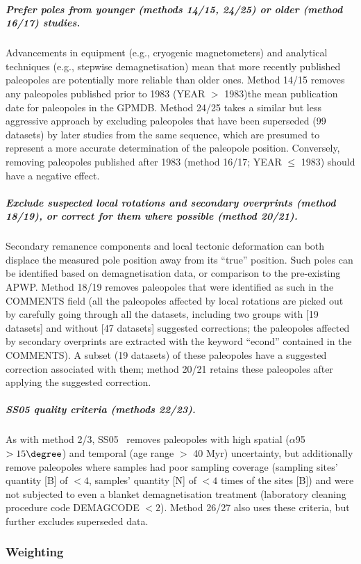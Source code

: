 \subparagraph{Prefer poles from younger (methods 14/15, 24/25) or older (method
16/17) studies.} Advancements in equipment (e.g., cryogenic magnetometers) and
analytical techniques (e.g., stepwise demagnetisation) mean that more recently
published paleopoles are potentially more reliable than older ones. Method 14/15
removes any paleopoles published prior to 1983 (YEAR $>$ 1983)\textemdash{}the
mean publication date for paleopoles in the GPMDB\@. Method 24/25 takes a
similar but less aggressive approach by excluding paleopoles that have been
superseded (99 datasets) by later studies from the same sequence, which are
presumed to represent a more accurate determination of the paleopole position.
Conversely, removing paleopoles published after 1983 (method 16/17; YEAR $\leq$
1983) should have a negative effect.

\subparagraph{Exclude suspected local rotations and secondary overprints
(method 18/19), or correct for them where possible (method 20/21).} Secondary
remanence components and local tectonic deformation can both displace the
measured pole position away from its ``true'' position. Such poles can be
identified based on demagnetisation data, or comparison to the pre-existing
APWP\@. Method 18/19 removes paleopoles that were identified as such in the
COMMENTS field (all the paleopoles affected by local rotations are picked out
by carefully going through all the datasets, including two groups with [19
datasets] and without [47 datasets] suggested corrections; the paleopoles
affected by secondary overprints are extracted with the keyword ``econd''
contained in the COMMENTS). A subset (19 datasets) of these paleopoles have a
suggested correction associated with them; method 20/21 retains these paleopoles
after applying the suggested correction.

\subparagraph{SS05 quality criteria (methods 22/23).} As with method 2/3,
SS05~\cite{S05} removes paleopoles with high spatial ($\alpha$95 $>15\degree$)
and temporal (age range $>$ 40 Myr) uncertainty, but additionally remove
paleopoles where samples had poor sampling coverage (sampling sites' quantity
[B] of $<4$, samples' quantity [N] of $<4$ times of the sites [B]) and were not
subjected to even a blanket demagnetisation treatment (laboratory cleaning
procedure code DEMAGCODE $<2$). Method 26/27 also uses these criteria, but
further excludes superseded data.

\subsubsection{Weighting}

